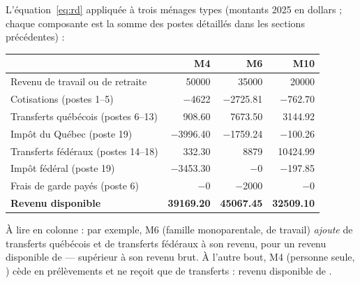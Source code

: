 \pexemples L'équation~\eqref{eq:rd} appliquée à trois ménages types (montants 2025
en dollars ; chaque composante est la somme des postes détaillés dans les
sections précédentes) :

\begin{center}
\small
\begin{tabular}{l r r r}
\toprule
 & M4 & M6 & M10 \\
\midrule
Revenu de travail ou de retraite & \num{50000} & \num{35000} & \num{20000} \\
Cotisations (postes 1--5) & $-$\num{4622} & $-$\num{2725.81} & $-$\num{762.70} \\
Transferts québécois (postes 6--13) & \num{908.60} & \num{7673.50} & \num{3144.92} \\
Impôt du Québec (poste 19) & $-$\num{3996.40} & $-$\num{1759.24} & $-$\num{100.26} \\
Transferts fédéraux (postes 14--18) & \num{332.30} & \num{8879} & \num{10424.99} \\
Impôt fédéral (poste 19) & $-$\num{3453.30} & $-$\num{0} & $-$\num{197.85} \\
Frais de garde payés (poste 6) & $-$\num{0} & $-$\num{2000} & $-$\num{0} \\
\midrule
\textbf{Revenu disponible} & \textbf{39169.20} & \textbf{45067.45} & \textbf{32509.10} \\
\bottomrule
\end{tabular}
\end{center}
\medskip\noindent À lire en colonne : par exemple, M6 (famille monoparentale,
 de travail) \emph{ajoute} 
de transferts québécois et  de
transferts fédéraux à son revenu, pour un revenu disponible de
 — supérieur à son revenu brut. À l'autre bout,
M4 (personne seule, ) cède 
en prélèvements et ne reçoit que 
de transferts : revenu disponible de .

